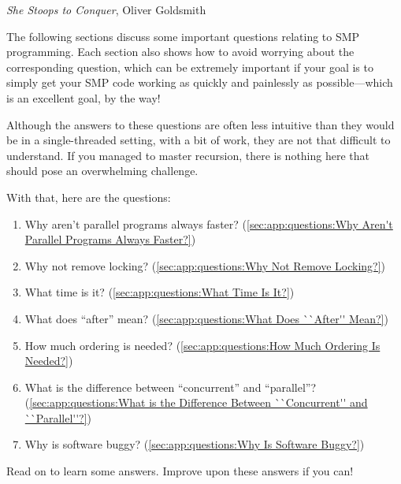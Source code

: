 
%
	 {\emph{She Stoops to Conquer}, Oliver Goldsmith}

The following sections discuss some important questions relating to
SMP programming.
Each section also shows how to avoid worrying about
the corresponding question, which can be extremely important if
your goal is to simply get your SMP code working as quickly and
painlessly as possible---which is an excellent goal, by the way!

Although the answers to these questions are often less
intuitive than they would be in a single-threaded setting,
with a bit of work, they are not that difficult to understand.
If you managed to master recursion, there is nothing here that should
pose an overwhelming challenge.

With that, here are the questions:

\begin{enumerate}
\item	Why aren't parallel programs always faster?
	(\cref{sec:app:questions:Why Aren't Parallel Programs Always Faster?})
\item	Why not remove locking?
	(\cref{sec:app:questions:Why Not Remove Locking?})
\item	What time is it?
	(\cref{sec:app:questions:What Time Is It?})
\item	What does ``after'' mean?
	(\cref{sec:app:questions:What Does ``After'' Mean?})
\item	How much ordering is needed?
	(\cref{sec:app:questions:How Much Ordering Is Needed?})
\item	What is the difference between ``concurrent'' and ``parallel''?
	(\cref{sec:app:questions:What is the Difference Between ``Concurrent'' and ``Parallel''?})
\item	Why is software buggy?
	(\cref{sec:app:questions:Why Is Software Buggy?})
\end{enumerate}

Read on to learn some answers.
Improve upon these answers if you can!










